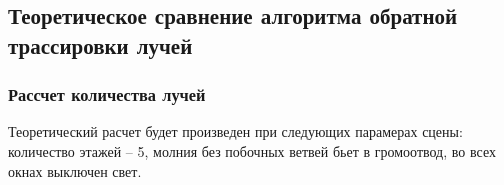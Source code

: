 
	


\subsection{Теоретическое сравнение алгоритма обратной трассировки лучей}

\subsubsection{Рассчет количества лучей}
Теоретический расчет будет произведен при следующих парамерах сцены: количество этажей -- 5, молния без побочных ветвей бьет в громоотвод, во всех окнах выключен свет.

